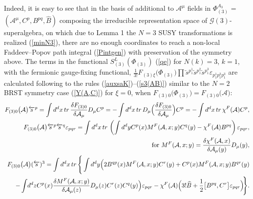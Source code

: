 \documentclass[10pt]{article}
\begin{document}
Indeed, it is easy to see that in the basis of additional to $\mathcal{A}^\mu$ fields in  $\Phi^{A_3}_{(3)}$ = $(\mathcal{A}^\mu, C^p, B^{pq}, \widehat{B})$ composing the irreducible  representation space of $\mathcal{G}(3)$-superalgebra,  on which due to Lemma 1 the $N=3$ SUSY transformations is realized  (\ref{minN3}), there are  no enough coordinates  to reach a non-local
Faddeev--Popov path integral  (\ref{Pintgen}) with preservation of the  symmetry above. The terms
in the functional $S^L_{(3)}(\Phi_{(3)})$ (\ref{qe}) for $N(k)=3$, $k=1$, with the fermionic  gauge-fixing functional, $\frac{1}{3!} F_{(3)\xi}\big(\Phi_{(3)}\big)\prod\overleftarrow{s}{}^{p^1_1}\overleftarrow{s}{}^{p^2_1}\overleftarrow{s}{}^{p^{3}_1}\varepsilon_{p^1_1p^2_1 p^3_1}$ are calculated following to the rules (\ref{auxsaK})--(\ref{s3(AB)}) similar to the $N=2$ BRST symmetry case
(\ref{Y(A,C)}) for $\xi=0$, when $F_{(3)0}\big(\Phi_{(3)}\big)=F_{(3)0}\big(\mathcal{A}\big)$:
\begin{eqnarray}
&& \label{auxsaKapp}   \hspace{-0.9em} F_{(3)0}\big(\mathcal{A}\big) \overleftarrow{s}{}^{p} = \int d^dx \,tr\, \frac{\delta F_{(3)0}}{\delta \mathcal{A}_{\mu
}}D_\mu C^p = - \int d^dx \,tr\,  D_\mu \Big(\frac{\delta F_{(3)0}}{\delta \mathcal{A}_{\mu
}}\Big) C^p  = - \int d^dx \,tr\, \chi^F(\mathcal{A}) C^p,\\
&&  \hspace{-0.9em} F_{(3)0}\big(\mathcal{A}\big) \overleftarrow{s}{}^{p}\overleftarrow{s}{}^{q}\varepsilon_{pqr} =   \int d^dx \, tr\, \left(\int d^dy  C^p(x)M^F(\mathcal{A},x;y) C^q(y)    - \chi^F(\mathcal{A})  B^{pq}\right)\varepsilon_{pqr} , \label{auxapp} \\
 && \ \ \mathrm{for} \ M^F(\mathcal{A},x;y)  =  \frac{\delta \chi^F(\mathcal{A},x)}{\delta \mathcal{A}_{\mu
}(y)}D_\mu(y), \label{auxsaK1app}  \\
  && \hspace{-0.9em}  F_{(3)0}\big(\mathcal{A}\big) (\overleftarrow{s})^{3}=   \int d^dx \, tr\, \Bigg\{\int d^dy \Big(  2B^{qp}(x)M^F(\mathcal{A},x;y) C^r(y)   +C^{p}(x)M^F(\mathcal{A},x;y) B^{qr}(y)  \nonumber \\
&&  \hspace{-0.9em} \ \  - \int\hspace{-0.2em} d^dz C^p(x) \frac{\delta M^F(\mathcal{A},x;y)}{\delta \mathcal{A}_{\mu
}(z)}D_\mu(z) C^r(z)  C^{q}(y)\Big)\varepsilon_{pqr} -  \chi^F(\mathcal{A}) \Big(3!\widehat{B}  + \frac{1}{2} \big[B^{pq}, C^r\big] \varepsilon_{pqr} \Big)\hspace{-0.2em}\Bigg\}.\label{s3(AB)app}%
\end{eqnarray}
\end{document}
